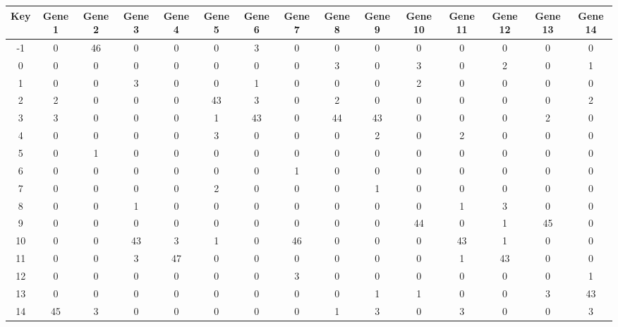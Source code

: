 \begin{tabular}{|c|c|c|c|c|c|c|c|c|c|c|c|c|c|c|}
\hline
Key & Gene 1 & Gene 2 & Gene 3 & Gene 4 & Gene 5 & Gene 6 & Gene 7 & Gene 8 & Gene 9 & Gene 10 & Gene 11 & Gene 12 & Gene 13 & Gene 14 \\
\hline
-1 & 0 & 46 & 0 & 0 & 0 & 3 & 0 & 0 & 0 & 0 & 0 & 0 & 0 & 0 \\
0 & 0 & 0 & 0 & 0 & 0 & 0 & 0 & 3 & 0 & 3 & 0 & 2 & 0 & 1 \\
1 & 0 & 0 & 3 & 0 & 0 & 1 & 0 & 0 & 0 & 2 & 0 & 0 & 0 & 0 \\
2 & 2 & 0 & 0 & 0 & 43 & 3 & 0 & 2 & 0 & 0 & 0 & 0 & 0 & 2 \\
3 & 3 & 0 & 0 & 0 & 1 & 43 & 0 & 44 & 43 & 0 & 0 & 0 & 2 & 0 \\
4 & 0 & 0 & 0 & 0 & 3 & 0 & 0 & 0 & 2 & 0 & 2 & 0 & 0 & 0 \\
5 & 0 & 1 & 0 & 0 & 0 & 0 & 0 & 0 & 0 & 0 & 0 & 0 & 0 & 0 \\
6 & 0 & 0 & 0 & 0 & 0 & 0 & 1 & 0 & 0 & 0 & 0 & 0 & 0 & 0 \\
7 & 0 & 0 & 0 & 0 & 2 & 0 & 0 & 0 & 1 & 0 & 0 & 0 & 0 & 0 \\
8 & 0 & 0 & 1 & 0 & 0 & 0 & 0 & 0 & 0 & 0 & 1 & 3 & 0 & 0 \\
9 & 0 & 0 & 0 & 0 & 0 & 0 & 0 & 0 & 0 & 44 & 0 & 1 & 45 & 0 \\
10 & 0 & 0 & 43 & 3 & 1 & 0 & 46 & 0 & 0 & 0 & 43 & 1 & 0 & 0 \\
11 & 0 & 0 & 3 & 47 & 0 & 0 & 0 & 0 & 0 & 0 & 1 & 43 & 0 & 0 \\
12 & 0 & 0 & 0 & 0 & 0 & 0 & 3 & 0 & 0 & 0 & 0 & 0 & 0 & 1 \\
13 & 0 & 0 & 0 & 0 & 0 & 0 & 0 & 0 & 1 & 1 & 0 & 0 & 3 & 43 \\
14 & 45 & 3 & 0 & 0 & 0 & 0 & 0 & 1 & 3 & 0 & 3 & 0 & 0 & 3 \\
\hline
\end{tabular}